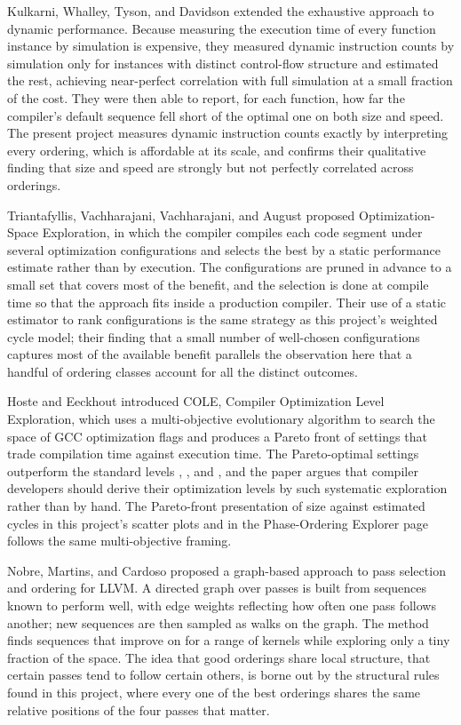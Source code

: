 Kulkarni, Whalley, Tyson, and Davidson \cite{kulkarni2009} extended the exhaustive approach to dynamic performance. Because measuring the execution time of every function instance by simulation is expensive, they measured dynamic instruction counts by simulation only for instances with distinct control-flow structure and estimated the rest, achieving near-perfect correlation with full simulation at a small fraction of the cost. They were then able to report, for each function, how far the compiler's default sequence fell short of the optimal one on both size and speed. The present project measures dynamic instruction counts exactly by interpreting every ordering, which is affordable at its scale, and confirms their qualitative finding that size and speed are strongly but not perfectly correlated across orderings.

Triantafyllis, Vachharajani, Vachharajani, and August \cite{triantafyllis2003} proposed Optimization-Space Exploration, in which the compiler compiles each code segment under several optimization configurations and selects the best by a static performance estimate rather than by execution. The configurations are pruned in advance to a small set that covers most of the benefit, and the selection is done at compile time so that the approach fits inside a production compiler. Their use of a static estimator to rank configurations is the same strategy as this project's weighted cycle model; their finding that a small number of well-chosen configurations captures most of the available benefit parallels the observation here that a handful of ordering classes account for all the distinct outcomes.

Hoste and Eeckhout \cite{hoste2008} introduced COLE, Compiler Optimization Level Exploration, which uses a multi-objective evolutionary algorithm to search the space of GCC optimization flags and produces a Pareto front of settings that trade compilation time against execution time. The Pareto-optimal settings outperform the standard levels , , and , and the paper argues that compiler developers should derive their optimization levels by such systematic exploration rather than by hand. The Pareto-front presentation of size against estimated cycles in this project's scatter plots and in the Phase-Ordering Explorer page follows the same multi-objective framing.

Nobre, Martins, and Cardoso \cite{nobre2016} proposed a graph-based approach to pass selection and ordering for LLVM. A directed graph over passes is built from sequences known to perform well, with edge weights reflecting how often one pass follows another; new sequences are then sampled as walks on the graph. The method finds sequences that improve on  for a range of kernels while exploring only a tiny fraction of the space. The idea that good orderings share local structure, that certain passes tend to follow certain others, is borne out by the structural rules found in this project, where every one of the best orderings shares the same relative positions of the four passes that matter.


